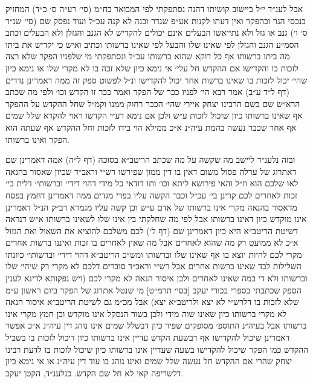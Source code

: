 \documentclass[12pt, openany]{book}
\begin{document}
\begin{multicols}{2}
אבל לענ״ד י״ל ביישוב קושיתו דהנה נסתפקתי לפי המבואר בח״מ (סי׳ רע״ה ס׳ כ״ד) המחזיק בנכסי הגר ובהפקר ואין דעתו לקנות אע״פ שגדר ובנה לא קנה עכ״ל ועוד נפסק שם (סי׳ שנ״ד ס׳ ו׳) גנב או גזל ולא נתייאשו הבעלים אינם יכולים להקדיש לא הגנב והגזלן ולא הבעלים וכתב הסמ״ע הגנב והגזלן לפי שאינו שלו והבעל לפי שאינו ברשותו וכתיב ואיש כי יקדיש את ביתו מה ביתו ברשותו אף כל דוקא שהוא ברשותו עכ״ל ונסתפקתי מי שלפניו הפקר שלא רצה לזכות בו והקדישו אם ההקדש חל עלי׳ אי נימא כיון שלא זכה בו לא מקרי שלו או נימא כיון שהי׳ יכול לזכות בו שאינו ברשות אחר יכול להקדישו ונ״ל לפשוט ספק זה ממה דאמרינן נדרים (דף ל״ד ע״ב) אמר רבא הי׳ לפניו ככר של הפקר ואמר ככר זו הקדש וכו׳ ולפי מה שכתב הרא״ש שם בשם הרבינו יצחק איירי שהי׳ הככר רחוק ממנו וקמ״ל שחל ההקדש על ההפקר אף שאינו ברשותו כיון שיכול לזכות ע״ש ולכן אם נימא דע״י הקדשו ראוי להקרא שלל שמים אף אחר שכבר נעשה בהמת עיה״נ א״כ ממילא הוי בידו לזכות וחל ההקדש אף שעתה הוא הפקר ואינו ברשותו.\\\vspace{0pt}

ובזה נלענ״ד ליישב מה שקשה על מה שכתב הריטב״א בסוכה (דף ל״ה) אמה דאמרינן שם דאתרוג של ערלה פסול משום דאין בו דין ממון שפירשו רש״י וראב״ד שכיון שאסור בהנאה לאו שלכם הוא וז״ל והאי פירושא ליתא וכו׳ ותו דודאי כל מידי דהוי דידי׳ וברשותי׳ דלית בי׳ זכות לאחרים לכם קרינן בי׳ עכ״ל וכבר הקשה עליו בפרי מגדים ממה דאמרינן דחמץ בפסח מדאסור בהנאה מקרי אינו ברשותו של אדם ע״ש וכן קשה עליו מגמרא דב״ק הנ״ל דאמרינן אינו מוקדש כיון דאינו ברשותו אבל לפי מה שחלקתי בין אינו שלו לשאינו ברשותו א״ש דנראה דשיטת הריטב״א היא כיון דאמרינן שם (דף ל׳) לכם משלכם להוציא את השאול ואת הגזול א״כ לא ממועט רק מה שהוא לאחרים אבל מה שאין לאחרים בו זכות ואיננו ברשות אחרים מקרי לכם להיות יוצא בו אף שאינו שלו וברשותו ומש״כ הריטב״א דהוי דידי׳ וברשותי׳ כוונתו השלילות לבד שאינו ברשות אחרים אבל רש״י וראב״ד סוברים דלכם לא מקרי רק שיהי׳ שלו וברשותו ולא די במה שאינו לאחרים ולכן איסור הנאה לא מקרי לכם (ויש נפקותא לדינא לענין הספק שכתבתי בספרי בכורי יעקב [בסי׳ תרמ״ט] מי שנטל אתרוג של הפקר ביום ראשון ע״מ שלא לזכות בו דלרש״י לא יצא ולריטב״א יצא) אבל מכ״מ גם לשיטת הריטב״א איסור הנאה לא מקרי ברשותו כיון שאינו שוה מידי ולכן בשור הנסקל אינו מוקדש וכן חמץ מקרי אינו ברשותו אבל בעיה״נ התוספ׳ מסופקים שפיר כיון דבשלל שמים אינו נוהג דין עיה״נ א״כ אפשר דאמרינן שיכול להקדישו אף דבשעת הקדש עדיין אינו ברשותו כיון דיכול לזכות בו בשביל ההקדש כמו הפקר שיכול להקדישו בשעה שעדיין אינו ברשותו כיון שיכול לזכות בו לדעת רבינו יצחק שהרי אם ההקדש חל נעשה שלל שמים ואינו נוהג בו עוד דין עיה״נ או אי נימא כיון דלשריפה קאי לא חל שם הקדש. כנלענ״ד, הקטן יעקב.\\\vspace{0pt}

\end{multicols}\newpage
\end{document}
